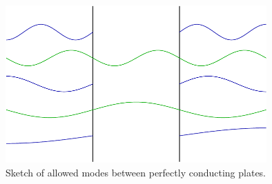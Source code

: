 \begin{figure}
\center
\includegraphics[width=10cm]{fig/intro/twoplanes_wave}
\caption{Sketch of allowed modes between perfectly conducting plates.}
\label{fig:Casimir_sketch}
\end{figure}

